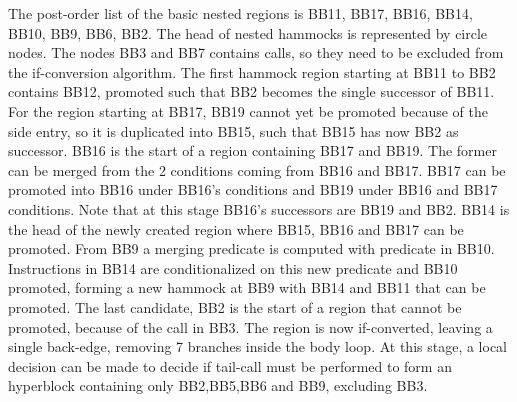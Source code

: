  The post-order list of the basic nested regions is {BB11, BB17, BB16, BB14, BB10, BB9, BB6, BB2}. The head of nested hammocks is represented by circle nodes. The nodes BB3 and BB7 contains calls, so they need to be excluded from the if-conversion algorithm.
The first hammock region starting at BB11 to BB2 contains BB12, promoted such that BB2 becomes the single successor of BB11. 
For the region starting at BB17, BB19 cannot yet be promoted because of the side entry, so it is duplicated into BB15, such that BB15 has now BB2 as successor.
BB16 is the start of a region containing BB17 and BB19. The former can be merged from the 2 conditions coming from BB16 and BB17. BB17 can be promoted into BB16 under BB16's conditions and BB19 under BB16 and BB17 conditions. Note that at this stage BB16's successors are BB19 and BB2.
BB14 is the head of the newly created region where BB15, BB16 and BB17 can be promoted. From BB9 a merging predicate is computed with predicate in BB10. Instructions in BB14 are conditionalized on this new predicate and BB10 promoted, forming a new hammock at BB9 with BB14 and BB11 that can be promoted. The last candidate, BB2 is the start of a region that cannot be promoted, because of the call in BB3.
The region is now if-converted, leaving a single back-edge, removing 7 branches inside the body loop. At this stage, a local decision can be made to decide if tail-call must be performed to form an hyperblock containing only BB2,BB5,BB6 and BB9, excluding BB3. 

